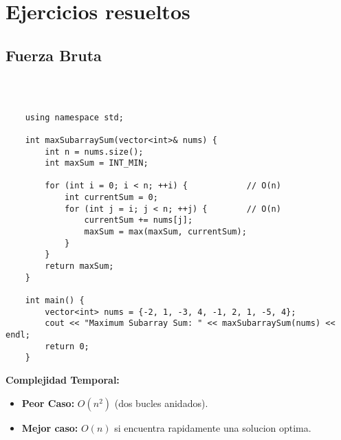 \section{Ejercicios resueltos}

\subsection{Fuerza Bruta}
    \begin{lstlisting}[style=cpp]
    
    
    
    using namespace std;
    
    int maxSubarraySum(vector<int>& nums) {
        int n = nums.size();
        int maxSum = INT_MIN;
    
        for (int i = 0; i < n; ++i) {            // O(n)
            int currentSum = 0;
            for (int j = i; j < n; ++j) {        // O(n)
                currentSum += nums[j];
                maxSum = max(maxSum, currentSum);
            }
        }
        return maxSum;
    }
    
    int main() {
        vector<int> nums = {-2, 1, -3, 4, -1, 2, 1, -5, 4};
        cout << "Maximum Subarray Sum: " << maxSubarraySum(nums) << endl;
        return 0;
    }
    \end{lstlisting}
    \textbf{Complejidad Temporal: }
    \begin{itemize}
        \item \textbf{Peor Caso: }$O(n^2)$ (dos bucles anidados).
        \item \textbf{Mejor caso: }$O(n)$ si encuentra rapidamente una solucion optima.
    \end{itemize}

